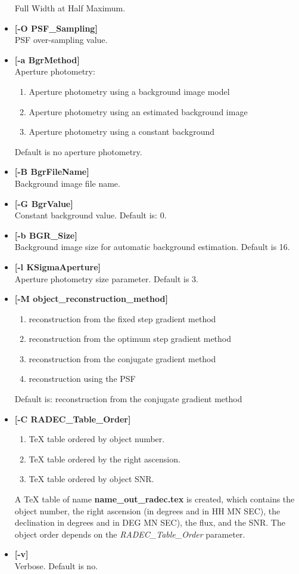 \begin{itemize}
Full Width at Half Maximum.
\item {\bf [-O PSF\_Sampling]} \\
PSF over-sampling value.
\item {\bf [-a BgrMethod] } \\
 Aperture photometry:
\begin{enumerate}
\baselineskip=0.4truecm
\itemsep=0.1truecm
\item Aperture photometry using a background image model 
\item Aperture photometry using an estimated background image 
\item Aperture photometry using a constant background 
\end{enumerate}
Default is no aperture photometry.
\item {\bf [-B BgrFileName]  } \\
Background image file name.
\item {\bf [-G BgrValue] } \\
Constant background value. Default is: 0.
\item {\bf  [-b BGR\_Size] } \\
Background image size for automatic background estimation.
Default is 16.
\item {\bf [-l KSigmaAperture]  } \\
Aperture photometry size parameter. Default is 3.
\item {\bf [-M object\_reconstruction\_method]}
\begin{enumerate}
\baselineskip=0.4truecm
\itemsep=0.1truecm
\item reconstruction from the fixed step gradient method 
\item reconstruction from the optimum step gradient method 
\item reconstruction from the conjugate gradient method 
\item reconstruction using the PSF
\end{enumerate}
Default is: reconstruction from the conjugate gradient method
\item {\bf [-C RADEC\_Table\_Order]}
\begin{enumerate}
\baselineskip=0.4truecm
\itemsep=0.1truecm
  \item TeX table ordered by object number.
  \item TeX table ordered by the right ascension.
  \item TeX table ordered by object SNR.
\end{enumerate}
A TeX table of name {\bf name\_out\_radec.tex} is created, which contains
the object number, the right ascension (in degrees and in HH MN SEC), the
declination in degrees and in DEG MN SEC), the flux, and the SNR. The object 
order depends on the {\em RADEC\_Table\_Order} parameter.
\item {\bf [-v]} \\
Verbose. Default is no.
\end{itemize}

